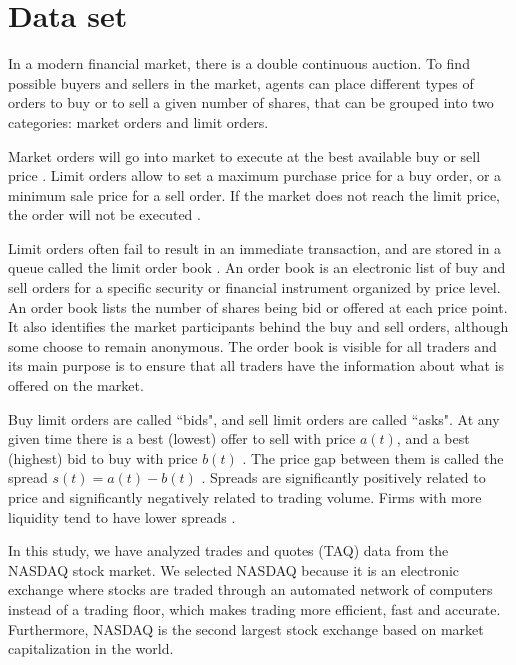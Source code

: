 \section{Data set}\label{sec:data}

In a modern financial market, there is a double continuous auction. To find
possible buyers and sellers in the market, agents can place different types of
orders to buy or to sell a given number of shares, that can be grouped into
two categories: market orders and limit orders.

Market orders will go into market to execute at the best available buy or sell
price \cite{large_prices_changes,predictive_pow,intro_market_micro,stat_theory}. Limit orders
allow to set a maximum purchase price for a buy order, or a minimum sale price
for a sell order. If the market does not reach the limit price, the order will
not be executed \cite{large_prices_changes,predictive_pow,intro_market_micro,stat_theory}.

Limit orders often fail to result in an immediate transaction, and are stored
in a queue called the limit order book
\cite{stat_prop,predictive_pow,intro_market_micro,prop_order_book}. An order book is an electronic
list of buy and sell orders for a specific security or financial instrument
organized by price level. An order book lists the number of shares being bid or
offered at each price point. It also identifies the market participants behind
the buy and sell orders, although some choose to remain anonymous. The order
book is visible for all traders and its main purpose is to ensure that all
traders have the information about what is offered on the market.

Buy limit orders are called ``bids", and sell limit orders are called ``asks".
At any given time there is a best (lowest) offer to sell with price
$a\left(t\right)$, and a best (highest) bid to buy with price $b\left(t\right)$
\cite{subtle_nature,account_spread,limit_ord_spread,prop_order_book,stat_theory}.
The price gap between them is called the spread
$s\left(t\right) = a\left(t\right)-b\left(t\right)$
\cite{subtle_nature,market_digest,Bouchaud_2004,account_spread,large_prices_changes,stat_theory}.
Spreads are significantly positively related to price and significantly
negatively related to trading volume. Firms with more liquidity tend to have
lower spreads
\cite{components_spread_tokyo,effects_spread,account_spread,components_spread}.

In this study, we have analyzed trades and quotes (TAQ) data from the NASDAQ
stock market. We selected NASDAQ because it is an electronic exchange where
stocks are traded through an automated network of computers instead of a
trading floor, which makes trading more efficient, fast and accurate.
Furthermore, NASDAQ is the second largest stock exchange based on market
capitalization in the world.

